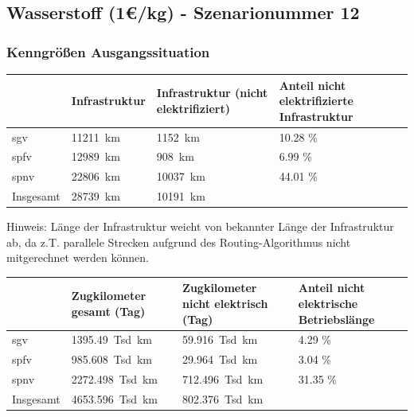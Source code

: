 \subsection{Wasserstoff (1€/kg) - Szenarionummer 12}\label{chap_kenngrößen_s_12}

\subsubsection{Kenngrößen Ausgangssituation}
\begin{center}
	\begin{tabularx}{\textwidth}{l | X | X | X} & Infrastruktur & Infrastruktur (nicht elektrifiziert) & Anteil nicht elektrifizierte Infrastruktur \\
	\hline
	\acrshort{sgv} & \SI{11211}{\km} & \SI{1152}{\km} & \num{10.28} \% \\
	\acrshort{spfv} & \SI{12989}{\km} & \SI{908}{\km} & \num{6.99} \% \\
	\acrshort{spnv} & \SI{22806}{\km} & \SI{10037}{\km} & \num{44.01} \% \\
	\hline
	Insgesamt & \SI{28739}{\km} & \SI{10191}{\km} & \\
	\end{tabularx}
\end{center}
\hspace{2em}

Hinweis: Länge der Infrastruktur weicht von bekannter Länge der Infrastruktur ab, da z.T. parallele Strecken aufgrund des Routing-Algorithmus nicht mitgerechnet werden können.

\begin{center}
	\begin{tabularx}{\textwidth}{l | X | X | X} & Zugkilometer gesamt (Tag) & Zugkilometer nicht elektrisch (Tag) & Anteil nicht elektrische Betriebslänge \\
	\hline
	\acrshort{sgv} & \SI{1395.49}{Tsd. \km} & \SI{59.916}{Tsd. \km} & \num{4.29}  \% \\
	\acrshort{spfv} & \SI{985.608}{Tsd. \km} & \SI{29.964}{Tsd. \km} & \num{3.04} \% \\
	\acrshort{spnv} & \SI{2272.498}{Tsd. \km} & \SI{712.496}{Tsd. \km} & \num{31.35} \% \\
	\hline
	Insgesamt & \SI{4653.596}{Tsd. \km} & \SI{802.376}{Tsd. \km} & \\
	\end{tabularx}
\end{center}


